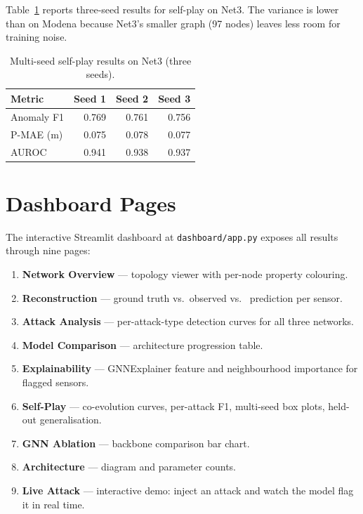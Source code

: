 Table~\ref{tab:app_net3_multiseed} reports three-seed results for
self-play on Net3. The variance is lower than on Modena because Net3's
smaller graph (97 nodes) leaves less room for training noise.

\begin{table}[htbp]
  \centering
  \caption{Multi-seed self-play results on Net3 (three seeds).}
  \label{tab:app_net3_multiseed}
  \begin{tabular}{lrrr}
    \toprule
    Metric & Seed 1 & Seed 2 & Seed 3 \\
    \midrule
    Anomaly F1  & 0.769 & 0.761 & 0.756 \\
    P-MAE (m)   & 0.075 & 0.078 & 0.077 \\
    AUROC       & 0.941 & 0.938 & 0.937 \\
    \bottomrule
  \end{tabular}
\end{table}

\section{Dashboard Pages}
\label{app:dashboard}

The interactive Streamlit dashboard at \texttt{dashboard/app.py}
exposes all results through nine pages:

\begin{enumerate}
  \item \textbf{Network Overview} — topology viewer with per-node
    property colouring.
  \item \textbf{Reconstruction} — ground truth vs.\ observed
    vs.\ \gnn{} prediction per sensor.
  \item \textbf{Attack Analysis} — per-attack-type detection
    curves for all three networks.
  \item \textbf{Model Comparison} — architecture progression table.
  \item \textbf{Explainability} — GNNExplainer feature and
    neighbourhood importance for flagged sensors.
  \item \textbf{Self-Play} — co-evolution curves, per-attack F1,
    multi-seed box plots, held-out generalisation.
  \item \textbf{GNN Ablation} — backbone comparison bar chart.
  \item \textbf{Architecture} — diagram and parameter counts.
  \item \textbf{Live Attack} — interactive demo: inject an attack
    and watch the model flag it in real time.
\end{enumerate}

